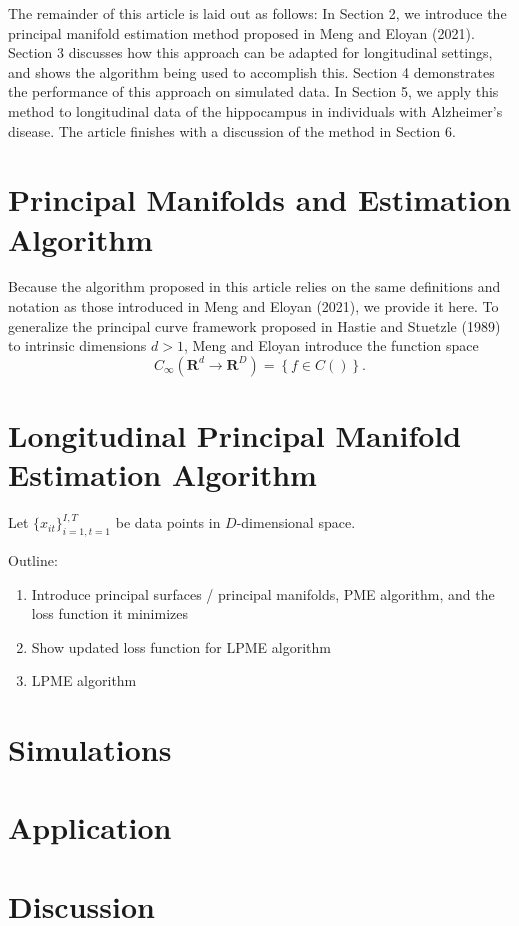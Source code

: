 \documentclass[11pt,reqno]{article}
\begin{document}
The remainder of this article is laid out as follows: In Section 2, we introduce the principal manifold estimation method proposed in Meng and Eloyan (2021). Section 3 discusses how this approach can be adapted for longitudinal settings, and shows the algorithm being used to accomplish this. Section 4 demonstrates the performance of this approach on simulated data. In Section 5, we apply this method to longitudinal data of the hippocampus in individuals with Alzheimer's disease. The article finishes with a discussion of the method in Section 6.

\section{Principal Manifolds and Estimation Algorithm}

Because the algorithm proposed in this article relies on the same definitions and notation as those introduced in Meng and Eloyan (2021), we provide it here. To generalize the principal curve framework proposed in Hastie and Stuetzle (1989) to intrinsic dimensions $d > 1$, Meng and Eloyan introduce the function space 
\[%
  C_{\infty}(\mathbf{R}^d \to \mathbf{R}^D) = \left\{f \in C()\right\}
.\]%

\section{Longitudinal Principal Manifold Estimation Algorithm}

Let $\{x_{it}\}_{i=1, t=1}^{I, T}$ be data points in $D$-dimensional space.

Outline:
\begin{enumerate}
    \item Introduce principal surfaces / principal manifolds, PME algorithm, and the loss function it minimizes
    \item Show updated loss function for LPME algorithm
    \item LPME algorithm
\end{enumerate}

\section{Simulations}

\section{Application}

\section{Discussion}
\end{document}
